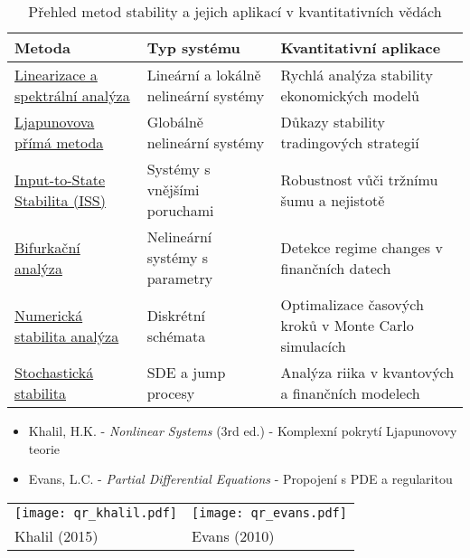 \begin{table}[H]
\centering
\begin{tabular}{|p{}|p{}|p{}|}
\hline
\textbf{Metoda} & \textbf{Typ systému} & \textbf{Kvantitativní aplikace} \\
\hline
\hyperref[sec:teorie-stability]{Linearizace a spektrální analýza} & Lineární a lokálně nelineární systémy & Rychlá analýza stability ekonomických modelů \\
\hline
\hyperref[sec:teorie-stability]{Ljapunovova přímá metoda} & Globálně nelineární systémy & Důkazy stability tradingových strategií \\
\hline
\hyperref[sec:teorie-stability]{Input-to-State Stabilita (ISS)} & Systémy s vnějšími poruchami & Robustnost vůči tržnímu šumu a nejistotě \\
\hline
\hyperref[sec:teorie-stability]{Bifurkační analýza} & Nelineární systémy s parametry & Detekce regime changes v finančních datech \\
\hline
\hyperref[sec:teorie-stability]{Numerická stabilita analýza} & Diskrétní schémata & Optimalizace časových kroků v Monte Carlo simulacích \\
\hline
\hyperref[sec:teorie-stability]{Stochastická stabilita} & SDE a jump procesy & Analýza riika v kvantových a finančních modelech \\
\hline
\end{tabular}
\caption{Přehled metod stability a jejich aplikací v kvantitativních vědách}
\label{tab:stability_methods}
\end{table}

\begin{tcolorbox}[title=Doporučená literatura: Teoretické základy, floatplacement=H]
\begin{itemize}
\item Khalil, H.K. - \emph{Nonlinear Systems} (3rd ed.) - Komplexní pokrytí Ljapunovovy teorie
\item Evans, L.C. - \emph{Partial Differential Equations} - Propojení s PDE a regularitou
\end{itemize}
\begin{center}
\begin{tabular}{m{}m{}}
\texttt{[image: qr\_khalil.pdf]} & \texttt{[image: qr\_evans.pdf]} \\
Khalil (2015) & Evans (2010) \\
\end{tabular}
\end{center}
\end{tcolorbox}

